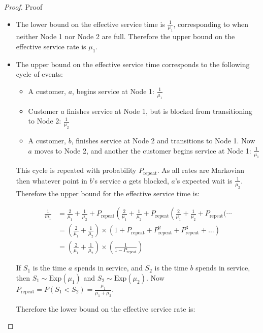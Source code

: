 \documentclass{article}
\numberwithin{equation}{section}
\begin{document}
\begin{proof}{Proof}
\begin{enumerate}
\begin{itemize}
\begin{itemize}

\item The lower bound on the effective service time is $\frac{1}{\mu_1}$,
corresponding to when neither Node 1 nor Node 2 are full.
Therefore the upper bound on the effective service rate is $\mu_1$.

\item The upper bound on the effective service time corresponds to the
following cycle of events:

\begin{itemize}
  \item A customer, $a$, begins service at Node 1: $\frac{1}{\mu_1}$
  \item Customer $a$ finishes service at Node 1, but is blocked from
  transitioning to Node 2: $\frac{1}{\mu_2}$
  \item A customer, $b$, finishes service at Node 2 and transitions to Node 1.
  Now $a$ moves to Node 2, and another the customer begins service at Node 1:
  $\frac{1}{\mu_1}$
\end{itemize}

This cycle is repeated with probability $P_{\text{repeat}}$.
As all rates are Markovian then whatever point in $b$'s service $a$ gets
blocked, $a$'s expected wait is $\frac{1}{\mu_2}$.
Therefore the upper bound for the effective service time is:

\begin{align*}
  \frac{1}{m_1} & = \frac{2}{\mu_1} + \frac{1}{\mu_2} + P_{\text{repeat}} \left( \frac{2}{\mu_1} + \frac{1}{\mu_2} + P_{\text{repeat}} \left( \frac{2}{\mu_1} + \frac{1}{\mu_2} + P_{\text{repeat}} \bigg( \dotsi \right. \right. \\
  & = \left( \frac{2}{\mu_1} + \frac{1}{\mu_2} \right) \times \left( 1 + P_{\text{repeat}} + P_{\text{repeat}}^2 + P_{\text{repeat}}^3 + \dots \right) \\
  & = \left( \frac{2}{\mu_1} + \frac{1}{\mu_2} \right) \times \left( \frac{1}{1 - P_{\text{repeat}}} \right)
\end{align*}

If $S_1$ is the time $a$ spends in service, and $S_2$ is the time $b$ spends
in service, then $S_1 \sim \text{Exp}(\mu_1)$ and $S_2 \sim \text{Exp}(\mu_2)$.
Now $P_{\text{repeat}} = P(S_1 < S_2) = \frac{\mu_1}{\mu_1 + \mu_2}$.

Therefore the lower bound on the effective service rate is:


\end{itemize}
\end{itemize}
\end{enumerate}
\end{proof}
\end{document}
